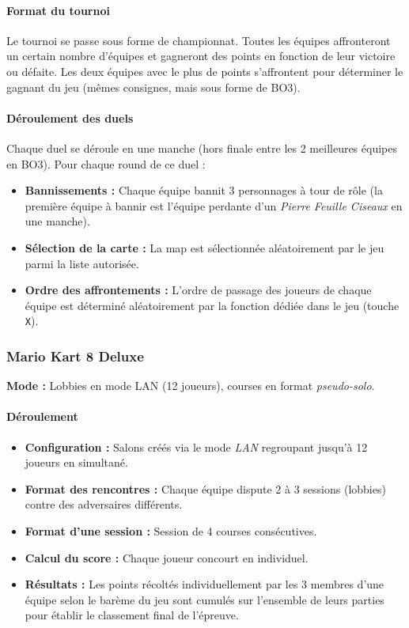 \documentclass[11pt,a4paper]{article}
\begin{document}
    \paragraph{Format du tournoi}
    Le tournoi se passe sous forme de championnat.
    Toutes les équipes affronteront un certain nombre d'équipes et gagneront des points en fonction de leur victoire ou défaite.
    Les deux équipes avec le plus de points s'affrontent pour déterminer le gagnant du jeu (mêmes consignes, mais sous forme de BO3).

    \paragraph{Déroulement des duels}
    Chaque duel se déroule en une manche (hors finale entre les 2 meilleures équipes en BO3).
    Pour chaque round de ce duel :
    \begin{itemize}
        \item \textbf{Bannissements :} Chaque équipe bannit 3 personnages à tour de rôle (la première équipe à bannir est l'équipe perdante d'un \textit{Pierre Feuille Ciseaux} en une manche).
        \item \textbf{Sélection de la carte :} La map est sélectionnée aléatoirement par le jeu parmi la liste autorisée.
        \item \textbf{Ordre des affrontements :} L'ordre de passage des joueurs de chaque équipe est déterminé aléatoirement par la fonction dédiée dans le jeu (touche \texttt{X}).
    \end{itemize}

    \subsubsection{Mario Kart 8 Deluxe}
    \textbf{Mode :} Lobbies en mode LAN (12 joueurs), courses en format \textit{pseudo-solo}.

    \paragraph{Déroulement}
    \begin{itemize}
        \item \textbf{Configuration :} Salons créés via le mode \textit{LAN} regroupant jusqu'à 12 joueurs en simultané.
        \item \textbf{Format des rencontres :} Chaque équipe dispute 2 à 3 sessions (lobbies) contre des adversaires différents.
        \item \textbf{Format d'une session :} Session de 4 courses consécutives.
        \item \textbf{Calcul du score :} Chaque joueur concourt en individuel.
        \item \textbf{Résultats :} Les points récoltés individuellement par les 3 membres d'une équipe selon le barème du jeu sont cumulés sur l'ensemble de leurs parties pour établir le classement final de l'épreuve.
    \end{itemize}
\end{document}
